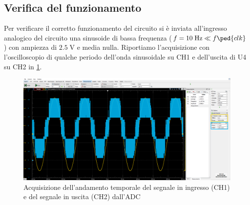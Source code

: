 \documentclass[10pt, a4paper, italian]{article}
\begin{document}
\subsection{Verifica del funzionamento}
Per verificare il corretto funzionamento del circuito si è inviata all'ingresso
analogico del circuito una sinusoide di bassa frequenza ($f = 10 \; \si{\Hz}
 \ll f\ped{clk}$) con ampiezza di $2.5 \; \si{\V}$ e media nulla.
Riportiamo l'acquisizione con l'oscilloscopio di qualche periodo dell'onda
sinusoidale su CH1 e dell'uscita di U4 su CH2 in \cref{fig: verif}.
\begin{figure}[htbp]
    \centering
	\includegraphics[width=\textwidth]{sin10hz2.5v}
    \caption{Acquisizione dell'andamento temporale del segnale in ingresso
    (CH1) e del segnale in uscita (CH2) dall'ADC
    \label{fig: verif}}
\end{figure}
\end{document}
